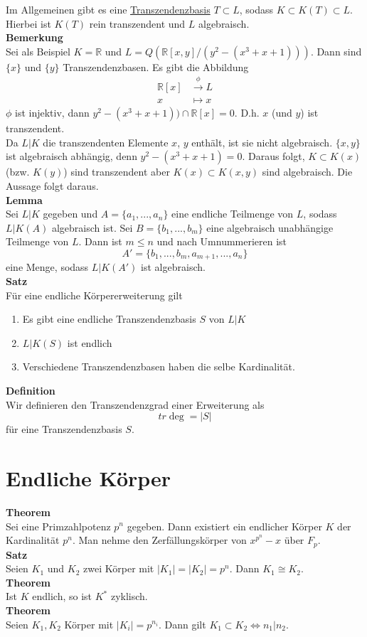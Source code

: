 \documentclass[a4paper, 12pt]{article}
\begin{document}
Im Allgemeinen gibt es eine \underline{Transzendenzbasis} $T \subset L$, sodass $K \subset K(T) \subset L$. Hierbei ist $K(T)$ rein transzendent und $L$ algebraisch.\\
\textbf{Bemerkung}\\
Sei als Beispiel $K = \mathbb{R}$ und $L = Q(\mathbb{R}[x,y]/(y^2-(x^3+x+1)))$. Dann sind $\{x\}$ und $\{y\}$ Transzendenzbasen. Es gibt die Abbildung \begin{align*}
	\mathbb{R}[x] & \overset{\phi}{\to} L\\
	x & \mapsto x
\end{align*} 
$\phi$ ist injektiv, dann $y^2-(x^3+x+1)) \cap \mathbb{R}[x] = 0$. D.h. $x$ (und $y$) ist transzendent.\\
Da $L|K$ die transzendenten Elemente $x$, $y$ enthält, ist sie nicht algebraisch. $\{x,y\}$ ist algebraisch abhängig, denn $y^2-(x^3+x+1)= 0$. Daraus folgt, $K\subset K(x)$ (bzw. $K(y)$) sind transzendent aber $K(x) \subset K(x,y)$ sind algebraisch. Die Aussage folgt daraus.\\
\textbf{Lemma}\\
Sei $L|K$ gegeben und $A = \{a_1,...,a_n\}$ eine endliche Teilmenge von $L$, sodass $L|K(A)$ algebraisch ist. Sei $B = \{b_1,...,b_m\}$ eine algebraisch unabhängige Teilmenge von $L$. Dann ist $m \leq n$ und nach Umnummerieren ist \[A' = \{b_1,...,b_m,a_{m+1},...,a_n\}\]
eine Menge, sodass $L|K(A')$ ist algebraisch.\\
\textbf{Satz}\\
Für eine endliche Körpererweiterung gilt \begin{enumerate}
	\item Es gibt eine endliche Transzendenzbasis $S$ von $L|K$
	\item $L|K(S)$ ist endlich
	\item Verschiedene Transzendenzbasen haben die selbe Kardinalität.
\end{enumerate}
\textbf{Definition}\\
Wir definieren den Transzendenzgrad einer Erweiterung als \[tr\deg = \left|S\right|\] für eine Transzendenzbasis $S$.
\section{Endliche Körper}
\textbf{Theorem}\\
Sei eine Primzahlpotenz $p^n$ gegeben. Dann existiert ein endlicher Körper $K$ der Kardinalität $p^n$. Man nehme den Zerfällungskörper von $x^{p^n}-x$ über $F_p$.\\
\textbf{Satz}\\
Seien $K_1$ und $K_2$ zwei Körper mit $\left|K_1\right| = \left|K_2\right| = p^n$. Dann $K_1 \cong K_2$.\\
\textbf{Theorem}\\
Ist $K$ endlich, so ist $K^*$ zyklisch.\\
\textbf{Theorem}\\
Seien $K_1, K_2$ Körper mit $\left|K_i\right| = p^{n_i}$. Dann gilt $K_1 \subset K_2 \Leftrightarrow n_1|n_2$.\\
\end{document}
